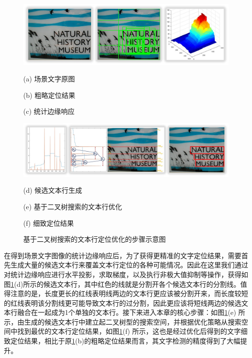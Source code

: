     \begin{figure}[!h]
    \centering
    \includegraphics[width=\textwidth]{./figures/c4_overview_1.jpg}
    \begin{minipage}[t]{0.23\linewidth}
    \centerline{ \small (a) 场景文字原图}
    \end{minipage}
    \begin{minipage}[t]{0.43\linewidth}
    \centerline{ \small (b) 粗略定位结果}
    \end{minipage}
    \begin{minipage}[t]{0.23\linewidth}
    \centerline{ \small (c) 统计边缘响应}
    \end{minipage}
    \includegraphics[width=\textwidth]{./figures/c4_overview_2.jpg}
    \begin{minipage}[t]{0.13\linewidth}
    \centerline{ \small (d) 候选文本行生成}
    \end{minipage}
    \begin{minipage}[t]{0.53\linewidth}
    \centerline{ \small (e) 基于二叉树搜索的文本行优化}
    \end{minipage}
    \begin{minipage}[t]{0.23\linewidth}
    \centerline{ \small (f) 细致定位结果}
    \end{minipage}
    \caption{基于二叉树搜索的文本行定位优化的步骤示意图}
    \label{fig.c4_overview}
    \end{figure}

    在得到场景文字图像的统计边缘响应后，为了获得更精准的文字定位结果，需要首先生成大量的候选文本行来覆盖文本行定位的各种可能情况。因此在这里我们通过对统计边缘响应进行水平投影，求取梯度，以及执行非极大值抑制等操作，获得如图\ref{fig.c4_overview}(d)所示的候选文本行，其中红色的线就是分割开各个候选文本行的分割线。值得注意的是，长度更长的红线表明线两边的文本行更应该被分割开来，而长度较短的红线表明该分割线更可能导致文本行的过分割，因此更应该将短线两边的候选文本行融合在一起成为1个单独的文本行。接下来进入本章的核心步骤：如图\ref{fig.c4_overview}(e) 所示，由生成的候选文本行中建立起二叉树型的搜索空间，并根据优化策略从搜索空间中找到最优的文本行定位结果，如图\ref{fig.c4_overview}(f) 所示，这也是经过优化后得到的文字细致定位结果，相比于原\ref{fig.c4_overview}(b)的粗略定位结果而言，其文字检测的精度得到了大幅提升。

